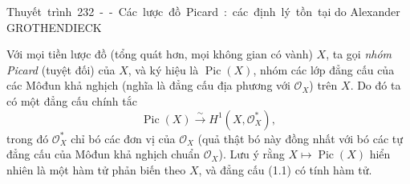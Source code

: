 \unit{Thuyết trình 232 -- Các lược đồ Picard: các định lý tồn tại}
%
  {do Alexander GROTHENDIECK}


Với mọi tiền lược đồ (tổng quát hơn, mọi không gian có vành) $X$, ta gọi
\emph{nhóm Picard} (tuyệt đối) của $X$, và ký hiệu là
$\operatorname{Pic}(X)$, nhóm các lớp đẳng cấu của các Môđun khả nghịch
(nghĩa là đẳng cấu địa phương với $\mathcal O_X$) trên $X$. Do đó ta có một
đẳng cấu chính tắc
\begin{equation}
\operatorname{Pic}(X)\xrightarrow{\sim}H^1(X,\mathcal O_X^*),
\tag{1.1}
\end{equation}
trong đó $\mathcal O_X^*$ chỉ bó các đơn vị của $\mathcal O_X$ (quả thật bó
này đồng nhất với bó các tự đẳng cấu của Môđun khả nghịch chuẩn
$\mathcal O_X$). Lưu ý rằng $X\longmapsto\operatorname{Pic}(X)$ hiển nhiên là
một hàm tử phản biến theo $X$, và đẳng cấu (1.1) có tính hàm tử.

